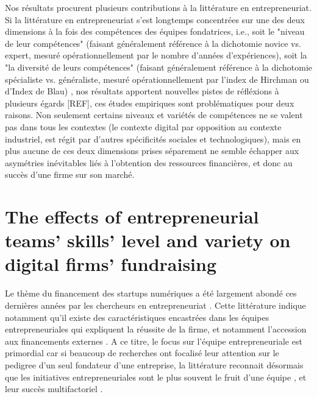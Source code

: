 \documentclass[12pt]{article}
\begin{document}
Nos résultats procurent plusieurs contributions à la littérature en entrepreneuriat. Si la littérature en entrepreneuriat s'est longtemps concentrées sur une des deux dimensions à la fois des compétences des équipes fondatrices, i.e., soit le "niveau de leur compétences" (faisant généralement référence à la dichotomie novice vs. expert, mesuré opérationnellement par le nombre d'années d'expériences), soit la "la diversité de leurs compétences" (faisant généralement référence à la dichotomie spécialiste vs. généraliste, mesuré opérationnellement par l'index de Hirchman ou d'Index de Blau) \citep{harrison2007s}, nos résultats apportent nouvelles pistes de réfléxions à plusieurs égards [REF], ces études empiriques sont problématiques pour deux raisons. Non seulement certains niveaux et variétés de compétences ne se valent pas dans tous les contextes (le contexte digital par opposition au contexte industriel, est régit par d'autres spécificités sociales et technologiques), mais en plus aucune de ces deux dimensions prises séparement ne semble échapper aux asymétries inévitables liés à l'obtention des ressources financières, et donc au succès d'une firme sur son marché.

\section{The effects of entrepreneurial teams' skills' level and variety on digital firms' fundraising}

Le thème du financement des startups numériques a été largement abondé ces dernières années par les chercheurs en entrepreneuriat \citep{klein2020start}. Cette littérature indique notamment qu'il existe des caractéristiques encastrées dans les équipes entrepreneuriales qui expliquent la réussite de la firme, et notamment l'accession aux financements externes \citep{pinelli2020too, reese2020should}. A ce titre, le focus sur l'équipe entrepreneuriale est primordial car si beaucoup de recherches ont focalisé leur attention sur le pedigree d'un seul fondateur d'une entreprise, la littérature reconnait désormais que les initiatives entrepreneuriales sont le plus souvent le fruit d'une équipe \citep{klotz2014new}, et leur succès multifactoriel \citep{roure1990predictors}.
\end{document}
